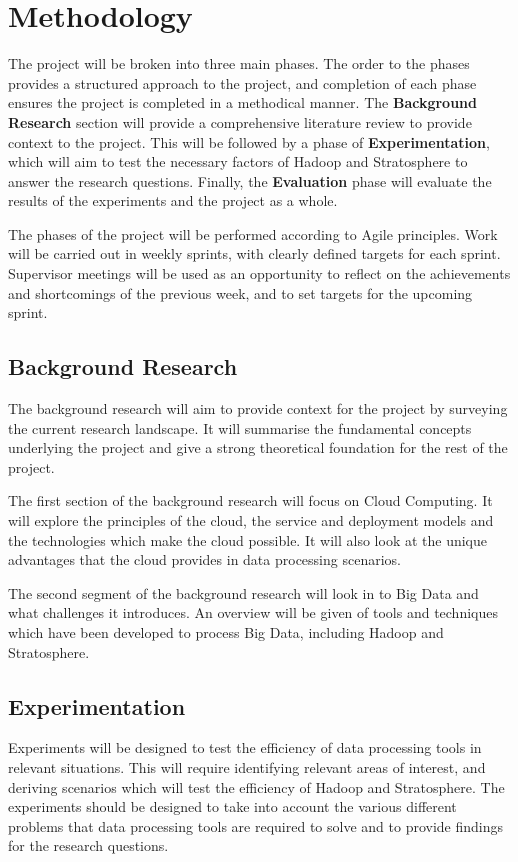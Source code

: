 \section{Methodology}
The project will be broken into three main phases. The order to the phases provides a structured approach to the project, and completion of each phase ensures the project is completed in a methodical manner. The \textbf{Background Research} section will provide a comprehensive literature review to provide context to the project. This will be followed by a phase of \textbf{Experimentation}, which will aim to test the necessary factors of Hadoop and Stratosphere to answer the research questions. Finally, the \textbf{Evaluation} phase will evaluate the results of the experiments and the project as a whole.

The phases of the project will be performed according to Agile principles. Work will be carried out in weekly sprints, with clearly defined targets for each sprint. Supervisor meetings will be used as an opportunity to reflect on the achievements and shortcomings of the previous week, and to set targets for the upcoming sprint.

\subsection{Background Research}
The background research will aim to provide context for the project by surveying the current research landscape. It will summarise the fundamental concepts underlying the project and give a strong theoretical foundation for the rest of the project.

The first section of the background research will focus on Cloud Computing. It will explore the principles of the cloud, the service and deployment models and the technologies which make the cloud possible. It will also look at the unique advantages that the cloud provides in data processing scenarios.

The second segment of the background research will look in to Big Data and what challenges it introduces. An overview will be given of tools and techniques which have been developed to process Big Data, including Hadoop and Stratosphere.

\subsection{Experimentation}
Experiments will be designed to test the efficiency of data processing tools in relevant situations. This will require identifying relevant areas of interest, and deriving scenarios which will test the efficiency of Hadoop and Stratosphere. The experiments should be designed to take into account the various different problems that data processing tools are required to solve and to provide findings for the research questions.

